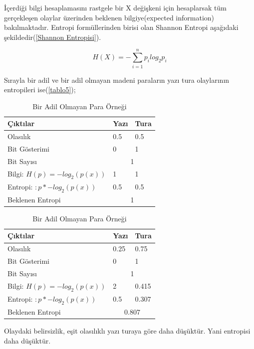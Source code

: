\documentclass[12pt, a4paper]{article}
\begin{document}
			İçerdiği bilgi hesaplamasını rastgele bir X değişkeni için hesaplarsak tüm gerçekleşen olaylar üzerinden beklenen bilgiye(expected information) bakılmaktadır. Entropi formüllerinden birisi olan Shannon Entropi aşağıdaki şekildedir(\ref{Shannon Entropisi}).
			\begin {center}
			\begin{equation}H(X) = - \sum_{i=1}^{n}p_i log_2 p_i	\label{eqn:Shannon Entropisi}
			\end{equation}
			\end {center}
			Sırayla bir adil ve bir adil olmayan madeni paraların yazı tura olaylarının entropileri ise(\ref{tablo5});\newline
				\begin{table}[!ht]\begin{minipage}{0.4\textwidth}
				\begin {center}
				\caption{ Bir Adil Madeni Para Örneği \cite{entropi}}	\label{tab:tablo5}
				\begin{tabular}{|l|l|l|}
					\hline
					Çıktılar & Yazı & Tura \\
					\hline
					Olasılık & 0.5 & 0.5 \\
					\hline
					Bit Gösterimi & 0 & 1 \\
					\hline
					Bit Sayısı & \multicolumn{2}{|c|}{1} \\
					\hline
					Bilgi: $H(p)= -log_2(p(x))$	& 1 & 1 \\
					\hline
					Entropi: $:p* -log_2(p(x))$	& 0.5 & 0.5  \\
					\hline
					Beklenen Entropi& \multicolumn{2}{|c|}{1}  \\
					\hline
				\end{tabular}
				\end {center}
			\end{minipage}\hfill
			\begin{minipage}{0.4\textwidth}
			
					\begin {center}
					\caption{Bir Adil Olmayan Para Örneği \cite{entropi}}	\label{tab:Tablo6}
				\begin{tabular}{|l|l|l|}
					\hline
					Çıktılar & Yazı & Tura \\
					\hline
					Olasılık & 0.25 & 0.75 \\
					\hline
					Bit Gösterimi & 0 & 1 \\
					\hline
					Bit Sayısı & \multicolumn{2}{|c|}{1} \\
					\hline
					Bilgi: $H(p)= -log_2(p(x))$	& 2 & 0.415 \\
					\hline
					Entropi: $:p*	 -log_2(p(x))$	& 0.5 & 0.307  \\
					\hline
					Beklenen Entropi& \multicolumn{2}{|c|}{0.807}  \\
					\hline
				\end{tabular}\label{tablo6}
				\end {center}
			\end{minipage}\newline
			\end{table}
			Olaydaki belirsizlik, eşit olasılıklı yazı turaya göre daha düşüktür. Yani entropisi daha düşüktür.
			
\end{document}
